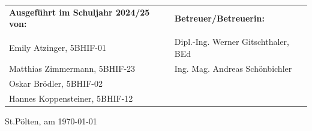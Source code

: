 \begin{flushleft}
\large
\vspace{3cm}
\begin{small}
\begin{tabular}{lp{2cm}l}

\textbf{Ausgeführt im Schuljahr 2024/25 von:} &  & \textbf{Betreuer/Betreuerin:} \\
\\																
Emily Atzinger, 5BHIF-01 & & Dipl.-Ing. Werner Gitschthaler, BEd  \\
Matthias Zimmermann, 5BHIF-23 & & Ing. Mag. Andreas Schönbichler \\
Oskar Brödler, 5BHIF-02 \\
Hannes Koppensteiner, 5BHIF-12 \\
\end{tabular}
\end{small}
\end{flushleft}

\vspace{1cm}

St.Pölten, am \today